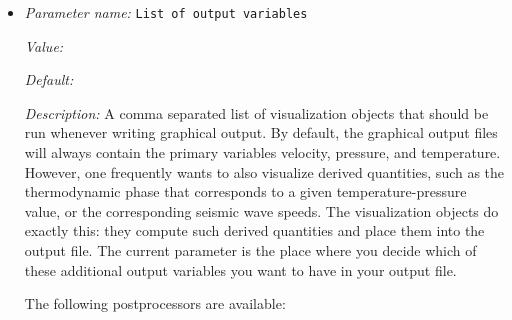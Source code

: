 \begin{itemize}
The effect of using this option can be seen in the following picture showing a variation of the output produced with the input files from Section~\ref{sec:shell-simple-2d}:

\begin{center}  \texttt{[image: viz/parameters/build-patches]}\end{center}Here, the left picture shows one visualization cell per computational cell (i.e., the option is switch off, as is the default), and the right picture shows the same simulation with the option switched on. The images show the same data, demonstrating that interpolating the solution onto bilinear shape functions as is commonly done in visualizing data loses information.

Of course, activating this option also greatly increases the amount of data \aspect{} will write to disk: approximately by a factor of 4 in 2d, and a factor of 8 in 3d, when using quadratic elements for the velocity, and correspondingly more for even higher order elements.


{\it Possible values:} A boolean value (true or false)
\item {\it Parameter name:} {\tt List of output variables}
\label{parameters:Postprocess/Visualization/List of output variables}


{\it Value:} 


{\it Default:} 


{\it Description:} A comma separated list of visualization objects that should be run whenever writing graphical output. By default, the graphical output files will always contain the primary variables velocity, pressure, and temperature. However, one frequently wants to also visualize derived quantities, such as the thermodynamic phase that corresponds to a given temperature-pressure value, or the corresponding seismic wave speeds. The visualization objects do exactly this: they compute such derived quantities and place them into the output file. The current parameter is the place where you decide which of these additional output variables you want to have in your output file.

The following postprocessors are available:


\end{itemize}
